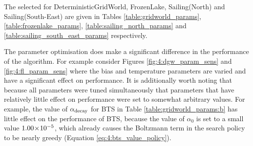     The selected  for DeterministicGridWorld, FrozenLake, Sailing(North) and Sailing(South-East) are given in Tables \ref{table:gridworld_params}, \ref{table:frozenlake_params}, \ref{table:sailing_north_params} and \ref{table:sailing_south_east_params} respectively. 

    The parameter optimisation does make a significant difference in the performance of the algorithm. For example consider Figures \ref{fig:4:dgw_param_sens} and \ref{fig:4:fl_param_sens} where the bias and temperature parameters are varied and have a significant effect on performance. It is additionally worth noting that because all parameters were tuned simultaneously that parameters that have relatively little effect on performance were set to somewhat arbitrary values. For example, the value of ${\alpha_{\text{decay}}}$ for BTS in Table \ref{table:gridworld_params:b} has little effect on the performance of BTS, because the value of $\alpha_0$ is set to a small value $1.00\!\times\!10^{-5}$, which already causes the Boltzmann term in the search policy to be nearly greedy (Equation \eqref{eq:4:bts_value_policy}).


